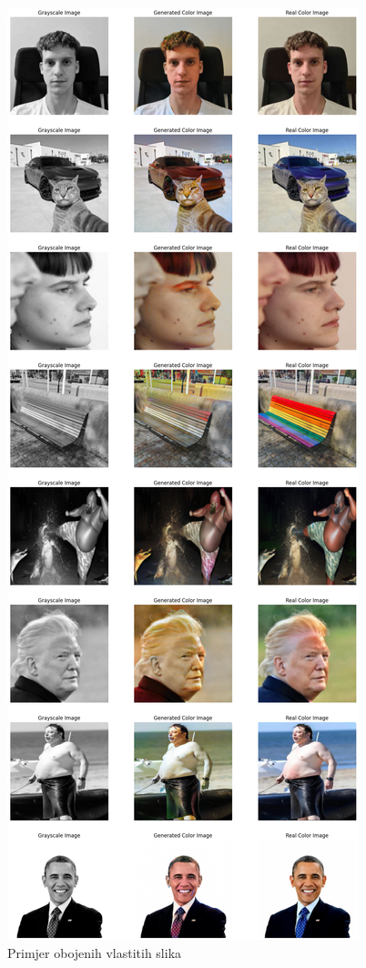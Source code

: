 \begin{figure}[H]
    \centering
    \includegraphics[width=0.9\linewidth]{imgs/slike_vlastite.png}
    \caption{Primjer obojenih vlastitih slika}
    \label{fig:slike_vlastite}
\end{figure}


